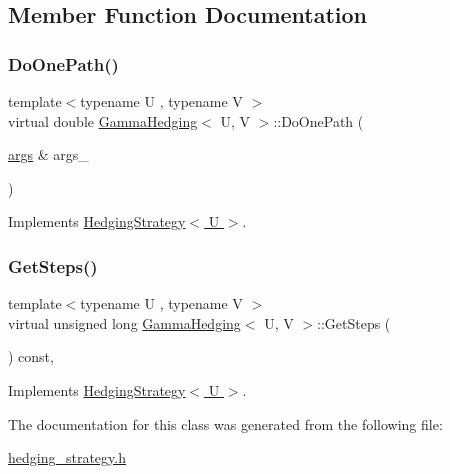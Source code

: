 \subsection{Member Function Documentation}
\hypertarget{classGammaHedging_afbdeab9edb6f515f8df2c1aac8ad54c0}{}\label{classGammaHedging_afbdeab9edb6f515f8df2c1aac8ad54c0} 
\subsubsection{\texorpdfstring{Do\+One\+Path()}{DoOnePath()}}
{\footnotesize\ttfamily template$<$typename U , typename V $>$ \\
virtual double \hyperlink{classGammaHedging}{Gamma\+Hedging}$<$ U, V $>$\+::Do\+One\+Path (\begin{DoxyParamCaption}\item[{\hyperlink{path__generation_8h_a75c13cde2074f502cc4348c70528572d}{args} \&}]{args\+\_\+ }\end{DoxyParamCaption})\hspace{0.3cm}{\ttfamily [virtual]}}



Implements \hyperlink{classHedgingStrategy_ad2a7c02ee59750c40f29a03ee6fee140}{Hedging\+Strategy$<$ U $>$}.

\hypertarget{classGammaHedging_a69b52f6cdb02d3289bf00029331625fe}{}\label{classGammaHedging_a69b52f6cdb02d3289bf00029331625fe} 
\subsubsection{\texorpdfstring{Get\+Steps()}{GetSteps()}}
{\footnotesize\ttfamily template$<$typename U , typename V $>$ \\
virtual unsigned long \hyperlink{classGammaHedging}{Gamma\+Hedging}$<$ U, V $>$\+::Get\+Steps (\begin{DoxyParamCaption}{ }\end{DoxyParamCaption}) const\hspace{0.3cm}{\ttfamily [inline]}, {\ttfamily [virtual]}}



Implements \hyperlink{classHedgingStrategy_a4df1155158f019fb0c4f565045b9e633}{Hedging\+Strategy$<$ U $>$}.



The documentation for this class was generated from the following file\+:\begin{DoxyCompactItemize}
\item 
\hyperlink{hedging__strategy_8h}{hedging\+\_\+strategy.\+h}\end{DoxyCompactItemize}

